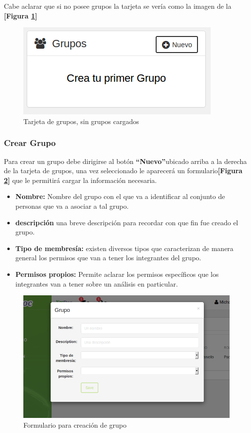 Cabe aclarar que si no posee  grupos la tarjeta se vería como la imagen de la \textbf{[Figura \ref{mu-sin_grupos}]}
     \begin{figure}
     	\centering
     	\includegraphics[width=.5\textwidth]{img/manual_de_usuario/sin_grupos}
     	\caption{Tarjeta de grupos, sin grupos cargados}
     	\label{mu-sin_grupos}
     \end{figure}   
\subsubsection{Crear Grupo}
Para crear un grupo debe dirigirse al botón \textbf{``Nuevo''}ubicado arriba a la derecha de la tarjeta de grupos, una vez seleccionado le aparecerá un formulario\textbf{[Figura \ref{mu-crear_grupo}]} que le permitirá cargar la información necesaria.

\begin{itemize}
	\item \textbf{Nombre:} Nombre del grupo con el que va a identificar al conjunto de personas que va a asociar a tal grupo.
	\item  \textbf{descripción } una breve descripción para recordar con que fin fue  creado el grupo.
	\item \textbf{Tipo de membresía: } existen diversos tipos que caracterizan de manera general los permisos que van a tener los integrantes del grupo.
	\item \textbf{Permisos propios:} Permite aclarar los permisos específicos que los integrantes van a tener sobre un análisis en particular.
\end{itemize}
    \begin{figure}
    	\centering
    	\includegraphics[width=.8\textwidth]{img/manual_de_usuario/crear_grupo}
    	\caption{Formulario para creación de grupo}
    	\label{mu-crear_grupo}
    \end{figure}




